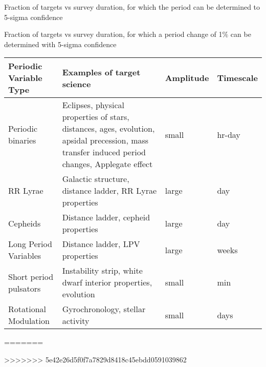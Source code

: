 Fraction of targets vs survey duration, for which the period can be determined to 5-sigma confidence

Fraction of targets vs survey duration, for which a period change of 1$\%$ can be determined with 5-sigma confidence


\begin{center}
\begin{tabular}{| l | p{8cm} |l | l |}
\hline Periodic Variable Type & Examples of target science & Amplitude & Timescale\\
\hline
Periodic binaries & Eclipses, physical properties of stars, distances, ages, evolution, apsidal precession, mass transfer induced period changes, Applegate effect &  small &  hr-day \\
RR Lyrae & Galactic structure, distance ladder, RR Lyrae properties&  large &  day \\
Cepheids & Distance ladder, cepheid properties&  large &  day \\
Long Period Variables & Distance ladder, LPV properties& large  &  weeks \\
Short period pulsators & Instability strip, white dwarf interior properties, evolution&  small & min  \\
Rotational Modulation & Gyrochronology, stellar activity& small  &  days \\
 \hline \end{tabular}
 \end{center}

=======






>>>>>>> 5e42e26d5f0f7a7829d8418c45ebdd0591039862














